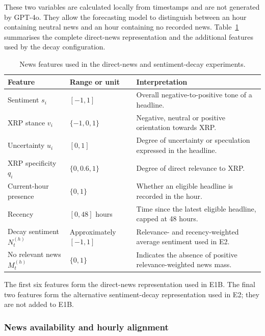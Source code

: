 These two variables are calculated locally from timestamps and are not generated by GPT-4o. They allow the forecasting model to distinguish between an hour containing neutral news and an hour containing no recorded news. Table~\ref{tab:newsfeatures} summarises the complete direct-news representation and the additional features used by the decay configuration.

\begin{table}[htbp]
\centering
\small
\caption{News features used in the direct-news and sentiment-decay experiments.}
\label{tab:newsfeatures}
\begin{tabular}{p{.24\linewidth}p{.17\linewidth}p{.49\linewidth}}
\toprule
Feature & Range or unit & Interpretation \\
\midrule
Sentiment $s_i$
& $[-1,1]$
& Overall negative-to-positive tone of a headline. \\

XRP stance $v_i$
& $\{-1,0,1\}$
& Negative, neutral or positive orientation towards XRP. \\

Uncertainty $u_i$
& $[0,1]$
& Degree of uncertainty or speculation expressed in the headline. \\

XRP specificity $q_i$
& $\{0,0.6,1\}$
& Degree of direct relevance to XRP. \\

Current-hour presence
& $\{0,1\}$
& Whether an eligible headline is recorded in the hour. \\

Recency
& $[0,48]$ hours
& Time since the latest eligible headline, capped at 48 hours. \\

Decay sentiment $N_t^{(h)}$
& Approximately $[-1,1]$
& Relevance- and recency-weighted average sentiment used in E2. \\

No relevant news $M_t^{(h)}$
& $\{0,1\}$
& Indicates the absence of positive relevance-weighted news mass. \\
\bottomrule
\end{tabular}
\end{table}

The first six features form the direct-news representation used in E1B. The final two features form the alternative sentiment-decay representation used in E2; they are not added to E1B.

\subsubsection{News availability and hourly alignment}

